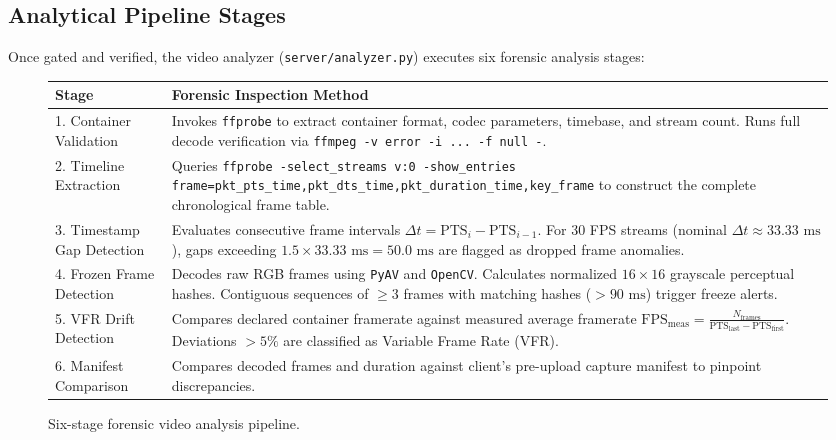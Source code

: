 \documentclass[11pt,a4paper]{article}
\begin{document}
\subsection{Analytical Pipeline Stages}
Once gated and verified, the video analyzer (\texttt{server/analyzer.py}) executes six forensic analysis stages:

\begin{figure}[htbp]
\centering
\small
\begin{tabularx}{\textwidth}{lX}
\toprule
\textbf{Stage} & \textbf{Forensic Inspection Method} \\
\midrule
1. Container Validation & Invokes \texttt{ffprobe} to extract container format, codec parameters, timebase, and stream count. Runs full decode verification via \texttt{ffmpeg -v error -i ... -f null -}. \\
2. Timeline Extraction & Queries \texttt{ffprobe -select\_streams v:0 -show\_entries frame=pkt\_pts\_time,pkt\_dts\_time,pkt\_duration\_time,key\_frame} to construct the complete chronological frame table. \\
3. Timestamp Gap Detection & Evaluates consecutive frame intervals $\Delta t = \text{PTS}_{i} - \text{PTS}_{i-1}$. For 30 FPS streams (nominal $\Delta t \approx 33.33\text{ ms}$), gaps exceeding $1.5 \times 33.33\text{ ms} = 50.0\text{ ms}$ are flagged as dropped frame anomalies. \\
4. Frozen Frame Detection & Decodes raw RGB frames using \texttt{PyAV} and \texttt{OpenCV}. Calculates normalized $16 \times 16$ grayscale perceptual hashes. Contiguous sequences of $\ge 3$ frames with matching hashes ($>90\text{ ms}$) trigger freeze alerts. \\
5. VFR Drift Detection & Compares declared container framerate against measured average framerate $\text{FPS}_{\text{meas}} = \frac{N_{\text{frames}}}{\text{PTS}_{\text{last}} - \text{PTS}_{\text{first}}}$. Deviations $>5\%$ are classified as Variable Frame Rate (VFR). \\
6. Manifest Comparison & Compares decoded frames and duration against client's pre-upload capture manifest to pinpoint discrepancies. \\
\bottomrule
\end{tabularx}
\caption{Six-stage forensic video analysis pipeline.}
\label{tab:analyzer_stages}
\end{figure}
\end{document}

